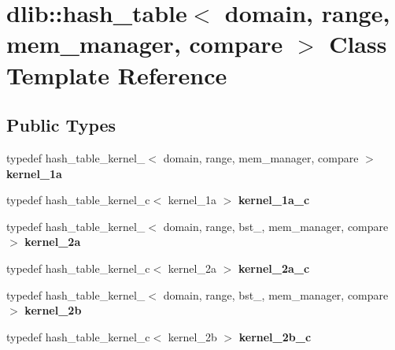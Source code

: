 \hypertarget{classdlib_1_1hash__table}{
\section{dlib::hash\_\-table$<$ domain, range, mem\_\-manager, compare $>$ Class Template Reference}
\label{classdlib_1_1hash__table}
}
\subsection*{Public Types}
\begin{DoxyCompactItemize}
\item 
\hypertarget{classdlib_1_1hash__table_a31668ea5710017284a1d074e8ccd5504}{
typedef hash\_\-table\_\-kernel\_$<$ domain, range, mem\_\-manager, compare $>$ {\bfseries kernel\_\-1a}}
\label{classdlib_1_1hash__table_a31668ea5710017284a1d074e8ccd5504}

\item 
\hypertarget{classdlib_1_1hash__table_ad6960dab7470258df610ab124cbbd34b}{
typedef hash\_\-table\_\-kernel\_\-c$<$ kernel\_\-1a $>$ {\bfseries kernel\_\-1a\_\-c}}
\label{classdlib_1_1hash__table_ad6960dab7470258df610ab124cbbd34b}

\item 
\hypertarget{classdlib_1_1hash__table_ae38f1a0190b7a141b0426bcf91e62976}{
typedef hash\_\-table\_\-kernel\_$<$ domain, range, bst\_, mem\_\-manager, compare $>$ {\bfseries kernel\_\-2a}}
\label{classdlib_1_1hash__table_ae38f1a0190b7a141b0426bcf91e62976}

\item 
\hypertarget{classdlib_1_1hash__table_ae904372c3be0de166a2cc84066dd61ed}{
typedef hash\_\-table\_\-kernel\_\-c$<$ kernel\_\-2a $>$ {\bfseries kernel\_\-2a\_\-c}}
\label{classdlib_1_1hash__table_ae904372c3be0de166a2cc84066dd61ed}

\item 
\hypertarget{classdlib_1_1hash__table_aa8d858865be3918b87e91e0ff52ede48}{
typedef hash\_\-table\_\-kernel\_$<$ domain, range, bst\_, mem\_\-manager, compare $>$ {\bfseries kernel\_\-2b}}
\label{classdlib_1_1hash__table_aa8d858865be3918b87e91e0ff52ede48}

\item 
\hypertarget{classdlib_1_1hash__table_a841b252e4fefbd8c638b7720773858d1}{
typedef hash\_\-table\_\-kernel\_\-c$<$ kernel\_\-2b $>$ {\bfseries kernel\_\-2b\_\-c}}
\label{classdlib_1_1hash__table_a841b252e4fefbd8c638b7720773858d1}

\end{DoxyCompactItemize}
